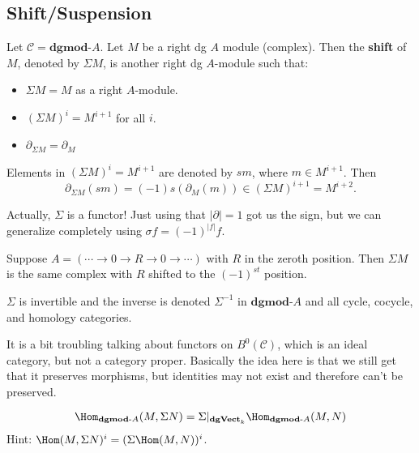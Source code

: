 \documentclass[12pt]{article}
\newcommand*{\dgVectk}{\mathbf{dgVect}_k}
\newcommand*{\dgmodA}{\mathbf{dgmod}\text{-}A}
\begin{document}
\subsection{Shift/Suspension}
\begin{defn}
	Let $\mathcal C=\dgmodA$. Let $M$ be a right dg $A$ module (complex). Then the \textbf{shift}
	of $M$, denoted by $\Sigma M$, is another right dg $A$-module such that:
	\begin{itemize}
		\item $\Sigma M=M$ as a right $A$-module.
		\item $(\Sigma M)^i=M^{i+1}$ for all $i$.
		\item $\partial_{\Sigma M}=\partial_M$
	\end{itemize}
\end{defn}
\begin{rmk}
	Elements in $(\Sigma M)^i=M^{i+1}$ are denoted by $sm$, where $m\in M^{i+1}$. Then 
	\[\partial_{\Sigma M}(sm)=(-1)s(\partial_M(m))\in (\Sigma M)^{i+1}=M^{i+2}.\]
\end{rmk}
\begin{rmk}
	Actually, $\Sigma$ is a functor! Just using that $|\partial|=1$ got us the sign, but we 
	can generalize completely using $\sigma f=(-1)^|f|f.$
\end{rmk}
\begin{ex}
	Suppose $A=(\cdots\to 0\to R\to 0\to \cdots)$ with $R$ in the zeroth position. Then $\Sigma M$ is the same complex
	with $R$ shifted to the $(-1)^{st}$ position.
\end{ex}
\begin{lem}
	$\Sigma$ is invertible and the inverse is denoted $\Sigma^{-1}$ in $\dgmodA$ and all cycle, cocycle, and homology categories.
\end{lem}
\begin{rmk}
	It is a bit troubling talking about functors on $B^0(\mathcal C)$, which is an ideal category, but not 
	a category proper. Basically the idea here is that we still get that it preserves morphisms, but identities may 
	not exist and therefore can't be preserved.
\end{rmk}
\begin{lem}
	\[\Hom_{\dgmodA}(M,\Sigma N)=\Sigma|_{\dgVectk} \Hom_{\dgmodA}(M,N)\] 
	Hint: $\Hom(M,\Sigma N)^i=(\Sigma\Hom(M,N))^i$.
\end{lem}
\end{document}
